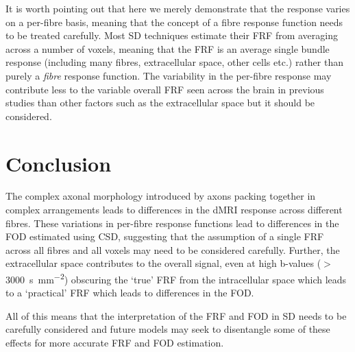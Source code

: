 It is worth pointing out that here we merely demonstrate that the response varies on a per-fibre basis, meaning that the concept of a fibre response function needs to be treated carefully. Most \ac{SD} techniques estimate their \ac{FRF} from averaging across a number of voxels, meaning that the \ac{FRF} is an average single bundle response (including many fibres, extracellular space, other cells etc.) rather than purely a \emph{fibre} response function.
The variability in the per-fibre response may contribute less to the variable overall \ac{FRF} seen across the brain in previous studies \cite{Schilling2019,Christiaens2020} than other factors such as the extracellular space but it should be considered. 


\section{Conclusion}
\label{sec:frf_conclusion}
The complex axonal morphology introduced by axons packing together in complex arrangements leads to differences in the \ac{dMRI} response across different fibres.
These variations in per-fibre response functions lead to differences in the \ac{FOD} estimated using \acl{CSD}, suggesting that the assumption of a single \ac{FRF} across all fibres and all voxels may need to be considered carefully.
Further, the extracellular space contributes to the overall signal, even at high b-values ($>$\SI{3000}{\second\per\milli\metre\squared}) obscuring the `true' \ac{FRF} from the intracellular space which leads to a `practical' \ac{FRF} which leads to differences in the \ac{FOD}.

All of this means that the interpretation of the \ac{FRF} and \ac{FOD} in \acl{SD} needs to be carefully considered and future models may seek to disentangle some of these effects for more accurate \ac{FRF} and \ac{FOD} estimation. 


